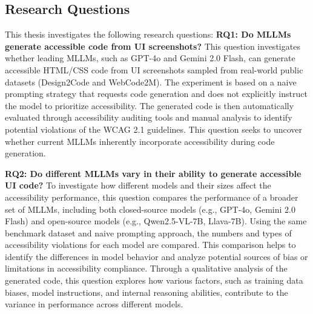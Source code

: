 \subsection{Research Questions}
This thesis investigates the following research questions: 
\newline\newline
\textbf{RQ1: Do MLLMs generate accessible code from UI screenshots?}
This question investigates whether leading MLLMs, such as GPT-4o and 
Gemini 2.0 Flash, can generate accessible HTML/CSS code from UI 
screenshots sampled from real-world public datasets (Design2Code and 
WebCode2M). The experiment is based on a naive prompting strategy 
that requests code generation and does not explicitly instruct 
the model to prioritize accessibility. The generated code is 
then automatically evaluated through accessibility auditing tools and 
manual analysis to identify potential violations of the WCAG 2.1
guidelines. This question seeks to uncover whether current MLLMs
inherently incorporate accessibility during 
code generation.\newline

\textbf{RQ2: Do different MLLMs vary in their ability to generate accessible UI code?}
To investigate how different models and their sizes affect the 
accessibility performance, this question compares the performance of 
a broader set of MLLMs, including both closed-source models
(e.g., GPT-4o, Gemini 2.0 Flash) and open-source
models (e.g., Qwen2.5-VL-7B, Llava-7B). Using the same benchmark dataset and 
naive prompting approach, the numbers and types of accessibility 
violations for each model are compared. This comparison helps to
identify the differences in model behavior and analyze potential 
sources of bias or limitations in accessibility compliance. 
Through a qualitative analysis of the generated code, this question 
explores how various factors, such as training data biases, model instructions, and
internal reasoning abilities, contribute to the variance in
performance across different models.
\newline


